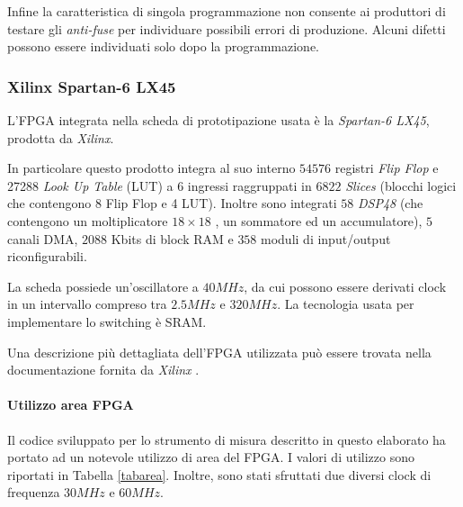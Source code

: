 Infine la caratteristica di singola programmazione non consente ai produttori di testare gli \textit{anti-fuse} per individuare possibili errori di produzione. Alcuni difetti possono essere individuati solo dopo la programmazione.

\subsubsection{Xilinx Spartan-6 LX45}
L'FPGA integrata nella scheda di prototipazione usata è la \textit{Spartan-6 LX45}, prodotta da \textit{Xilinx}.

In particolare questo prodotto integra al suo interno $54576$ registri \textit{Flip Flop} e 27288 \textit{Look Up Table} (LUT) a 6 ingressi raggruppati in $6822$ \textit{Slices} (blocchi logici che contengono 8 Flip Flop e 4 LUT). Inoltre sono integrati $58$ \textit{DSP48} (che contengono un moltiplicatore $18 \times 18$ , un sommatore ed un accumulatore), $5$ canali DMA, $2088$ Kbits di block RAM e $358$ moduli di input/output riconfigurabili. 

La scheda possiede un'oscillatore a $40MHz$, da cui possono essere derivati clock in un intervallo compreso tra $2.5MHz$ e $320MHz$. La tecnologia usata per implementare lo switching è SRAM. 

Una descrizione più dettagliata dell'FPGA utilizzata può essere trovata nella documentazione fornita da \textit{Xilinx} \cite{dsxilinx}.

\paragraph{Utilizzo area FPGA}
Il codice sviluppato per lo strumento di misura descritto in questo elaborato ha portato ad un notevole utilizzo di area del FPGA. I valori di utilizzo sono riportati in Tabella \ref{tabarea}. Inoltre, sono stati sfruttati due diversi clock di frequenza $30MHz$ e $60MHz$.

